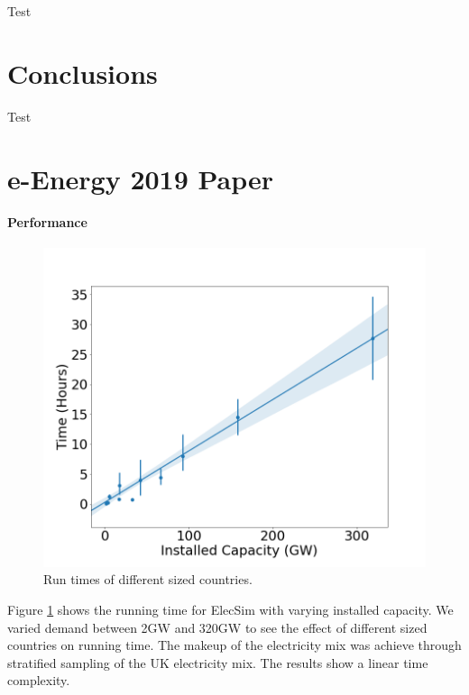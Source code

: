 Test


\section{Conclusions}

Test













\section{e-Energy 2019 Paper}




















\paragraph{Performance}


\begin{figure}
	\centering
	\includegraphics[width=0.7\linewidth]{Chapter4/figures/timing_plot.png}
	\caption{Run times of different sized countries.}
	\label{fig:timingplot}
	\vskip -0.5cm
\end{figure}


Figure \ref{fig:timingplot} shows the running time for ElecSim with varying installed capacity. We varied demand between 2GW and 320GW to see the effect of different sized countries on running time. The makeup of the electricity mix was achieve through stratified sampling of the UK electricity mix. The results show a linear time complexity. 


